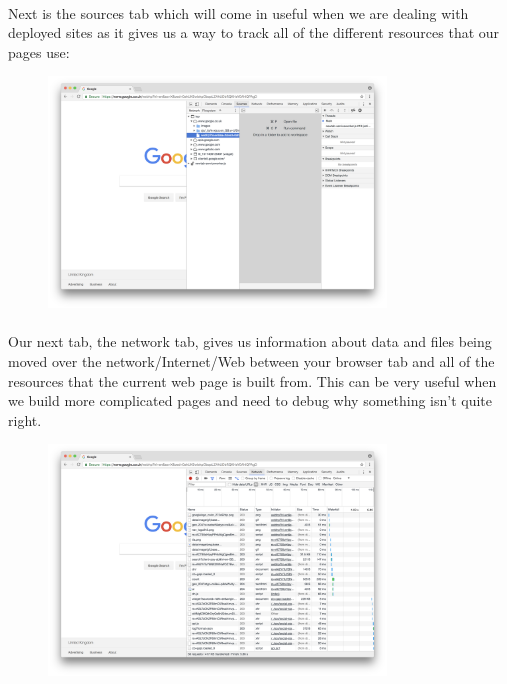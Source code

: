 \documentclass[12pt, a4paper, oneside]{book}
\begin{document}
\paragraph{} Next is the sources tab which will come in useful when we are dealing with deployed sites as it gives us a way to track all of the different resources that our pages use:


\begin{figure}[H]
\centering
\includegraphics[width=0.8\textwidth]{figures/devtools_sources.png}
\label{fig:devtools_sources}
\end{figure}

\paragraph{} Our next tab, the network tab, gives us information about data and files being moved over the network/Internet/Web between your browser tab and all of the resources that the current web page is built from. This can be very useful when we build more complicated pages and need to debug why something isn't quite right.

\begin{figure}[H]
\centering
\includegraphics[width=0.8\textwidth]{figures/devtools-network.png}
\label{fig:devtools-network}
\end{figure}
\end{document}
